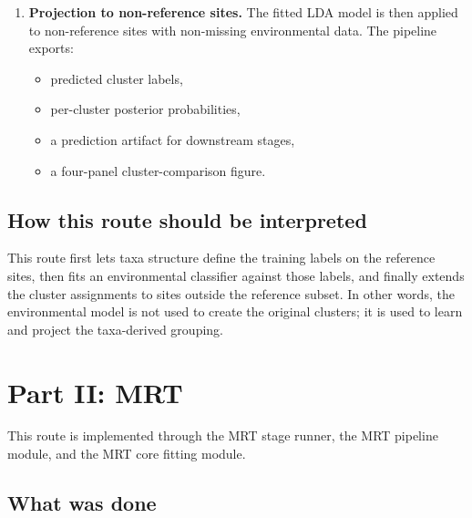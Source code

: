 \documentclass[11pt]{article}
\begin{document}
\begin{enumerate}[leftmargin=*]
  \item \textbf{Projection to non-reference sites.}
  The fitted LDA model is then applied to non-reference sites with non-missing environmental data. The pipeline exports:
  \begin{itemize}[leftmargin=*]
    \item predicted cluster labels,
    \item per-cluster posterior probabilities,
    \item a prediction artifact for downstream stages,
    \item a four-panel cluster-comparison figure.
  \end{itemize}
\end{enumerate}

\subsection{How this route should be interpreted}

This route first lets taxa structure define the training labels on the reference sites, then fits an environmental classifier against those labels, and finally extends the cluster assignments to sites outside the reference subset. In other words, the environmental model is not used to create the original clusters; it is used to learn and project the taxa-derived grouping.

\section{Part II: MRT}

This route is implemented through the MRT stage runner, the MRT pipeline
module, and the MRT core fitting module.

\subsection{What was done}
\end{document}
